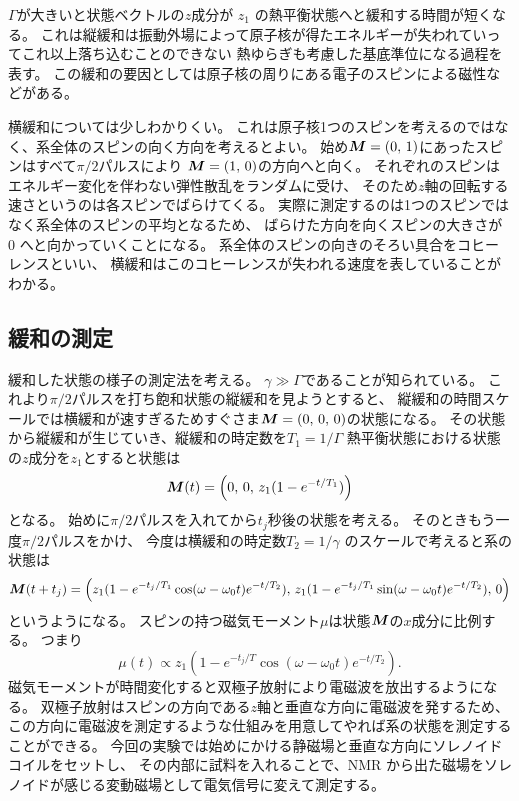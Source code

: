 \documentclass[11pt,dvipdfmx,a4paper]{jsarticle}
\begin{document}
\(\Gamma\)が大きいと状態ベクトルの\(z\)成分が \(z_1\) の熱平衡状態へと緩和する時間が短くなる。
これは縦緩和は振動外場によって原子核が得たエネルギーが失われていってこれ以上落ち込むことのできない
熱ゆらぎも考慮した基底準位になる過程を表す。
この緩和の要因としては原子核の周りにある電子のスピンによる磁性などがある。%

横緩和については少しわかりくい。
これは原子核1つのスピンを考えるのではなく、系全体のスピンの向く方向を考えるとよい。
始め\(\vb*{M}=(0,\,1)\)にあったスピンはすべて\(\pi/2\)パルスにより
\(\vb*{M}=(1,\,0)\)の方向へと向く。
それぞれのスピンはエネルギー変化を伴わない弾性散乱をランダムに受け、
そのため\(z\)軸の回転する速さというのは各スピンでばらけてくる。
実際に測定するのは1つのスピンではなく系全体のスピンの平均となるため、
ばらけた方向を向くスピンの大きさが 0 へと向かっていくことになる。
系全体のスピンの向きのそろい具合をコヒーレンスといい、
横緩和はこのコヒーレンスが失われる速度を表していることがわかる。

\subsection{緩和の測定}
緩和した状態の様子の測定法を考える。
\(\gamma\gg\Gamma\)であることが知られている。
これより\(\pi/2\)パルスを打ち飽和状態の縦緩和を見ようとすると、
縦緩和の時間スケールでは横緩和が速すぎるためすぐさま\(\vb*{M}=(0,\,0,\,0)\)の状態になる。
その状態から縦緩和が生じていき、縦緩和の時定数を\(T_1 = 1/\Gamma\)
熱平衡状態における状態の\(z\)成分を\(z_1\)とすると状態は
\begin{equation}
	\vb*{M}(t) = \qty(0,\,0,\,z_1(1-e^{-t/T_1}))
\end{equation}
となる。
始めに\(\pi/2\)パルスを入れてから\(t_j\)秒後の状態を考える。
そのときもう一度\(\pi/2\)パルスをかけ、
今度は横緩和の時定数\(T_2=1/\gamma\) のスケールで考えると系の状態は
\begin{equation}
	\vb*{M}(t+t_j) = \qty(z_1(1-e^{-t_j/T_1}\cos(\omega-\omega_0 t)e^{-t/T_2}),\,
	z_1(1-e^{-t_j/T_1}\sin(\omega-\omega_0 t)e^{-t/T_2}),\,0)
\end{equation}
というようになる。
スピンの持つ磁気モーメント\(\mu\)は状態\(\vb*{M}\)の\(x\)成分に比例する。
つまり
\begin{equation}
	\mu(t) \propto z_1(1-e^{-t_j/T}\cos(\omega-\omega_0 t)e^{-t/T_2}). \label{eq:MD_T2_ev}
\end{equation}
磁気モーメントが時間変化すると双極子放射により電磁波を放出するようになる。
双極子放射はスピンの方向である\(z\)軸と垂直な方向に電磁波を発するため、
この方向に電磁波を測定するような仕組みを用意してやれば系の状態を測定することができる。
今回の実験では始めにかける静磁場と垂直な方向にソレノイドコイルをセットし、
その内部に試料を入れることで、NMR から出た磁場をソレノイドが感じる変動磁場として電気信号に変えて測定する。
\end{document}
